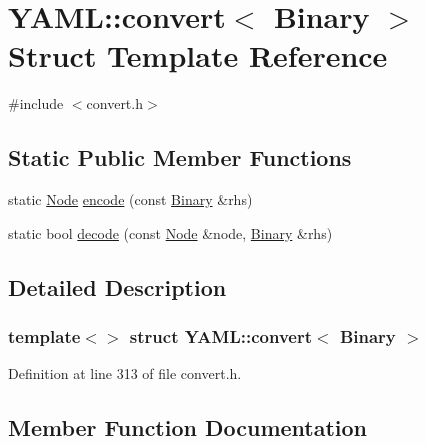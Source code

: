 \hypertarget{struct_y_a_m_l_1_1convert_3_01_binary_01_4}{}\section{Y\+A\+ML\+::convert$<$ Binary $>$ Struct Template Reference}
\label{struct_y_a_m_l_1_1convert_3_01_binary_01_4}


{\ttfamily \#include $<$convert.\+h$>$}

\subsection*{Static Public Member Functions}
\begin{DoxyCompactItemize}
\item 
static \mbox{\hyperlink{class_y_a_m_l_1_1_node}{Node}} \mbox{\hyperlink{struct_y_a_m_l_1_1convert_3_01_binary_01_4_a8dd2c818f89609cf183452be9f6dc12c}{encode}} (const \mbox{\hyperlink{class_y_a_m_l_1_1_binary}{Binary}} \&rhs)
\item 
static bool \mbox{\hyperlink{struct_y_a_m_l_1_1convert_3_01_binary_01_4_aff592c01b556f5aef9ba9199fdb1720e}{decode}} (const \mbox{\hyperlink{class_y_a_m_l_1_1_node}{Node}} \&node, \mbox{\hyperlink{class_y_a_m_l_1_1_binary}{Binary}} \&rhs)
\end{DoxyCompactItemize}


\subsection{Detailed Description}
\subsubsection*{template$<$$>$\newline
struct Y\+A\+M\+L\+::convert$<$ Binary $>$}



Definition at line 313 of file convert.\+h.



\subsection{Member Function Documentation}
\mbox{\label{struct_y_a_m_l_1_1convert_3_01_binary_01_4_aff592c01b556f5aef9ba9199fdb1720e}} 
